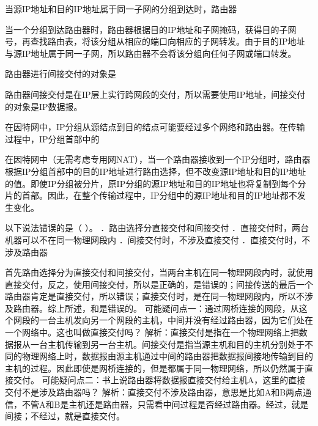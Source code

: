 \question 当源IP地址和目的IP地址属于同一子网的分组到达时，路由器
\par{}
\begin{solution}当一个分组到达路由器时，路由器根据目的IP地址和子网掩码，获得目的子网号，再查找路由表，将该分组从相应的端口向相应的子网转发。由于目的IP地址与源IP地址属于同一子网，所以路由器不会将该分组向任何子网或端口转发。
\end{solution}
\question 路由器进行间接交付的对象是
\par{}
\begin{solution}路由器间接交付是在IP层上实行跨网段的交付，所以需要使用IP地址，间接交付的对象是IP数据报。
\end{solution}
\question 在因特网中，IP分组从源结点到目的结点可能要经过多个网络和路由器。在传输过程中，IP分组首部中的
\par{}
\begin{solution}在因特网中（无需考虑专用网NAT），当一个路由器接收到一个IP分组时，路由器根据IP分组首部中的目的IP地址进行路由选择，但不改变源IP地址和目的IP地址的值。即使IP分组被分片，原IP分组的源IP地址和目的IP地址也将复制到每个分片的首部。因此，在整个传输过程中，IP分组中的源IP地址和目的IP地址都不发生变化。
\end{solution}
\question 以下说法错误的是（ ）。 ．路由选择分直接交付和间接交付
．直接交付时，两台机器可以不在同一物理网段内
．间接交付时，不涉及直接交付 ．直接交付时，不涉及路由器
\par{}
\begin{solution}首先路由选择分为直接交付和间接交付，当两台主机在同一物理网段内时，就使用直接交付，反之，使用间接交付，所以是正确的，是错误的；间接传送的最后一个路由器肯定是直接交付，所以错误；直接交付时，是在同一物理网段内，所以不涉及路由器。综上所述，和是错误的。
可能疑问点一：通过网桥连接的网段，从这个网段的一台主机发向另一个网段的主机，中间并没有经过路由器，因为它们处在一个网络中。这也叫做直接交付吗？
解析：直接交付是指在一个物理网络上把数据报从一台主机传输到另一台主机。间接交付是指当源主机和目的主机分别处于不同的物理网络上时，数据报由源主机通过中间的路由器把数据报间接地传输到目的主机的过程。因此即使是网桥连接的，但是都属于同一物理网络，所以仍然属于直接交付。
可能疑问点二：书上说路由器将数据报直接交付给主机A，这里的直接交付不是涉及路由器吗？
解析：直接交付不涉及路由器，意思是比如A和B两点通信，不管A和B是主机还是路由器，只需看中间过程是否经过路由器。经过，就是间接；不经过，就是直接交付。
\end{solution}
